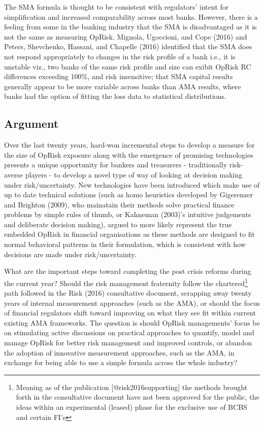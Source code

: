 \documentclass[]{DissertateUSU}
\let\rmarkdownfootnote\footnote%
\def\footnote{\protect\rmarkdownfootnote}
\begin{document}
The SMA formula is thought to be consistent with regulators' intent for
simplification and increased comparability across most banks. However,
there is a feeling from some in the banking industry that the SMA is
disadvantaged as it is not the same as measuring OpRisk. Mignola,
Ugoccioni, and Cope (2016) and Peters, Shevchenko, Hassani, and Chapelle
(2016) identified that the SMA does not respond appropriately to changes
in the risk profile of a bank i.e., it is unstable viz., two banks of
the same risk profile and size can exibit OpRisk RC differences
exceeding 100\%, and risk insensitive; that SMA capital results
generally appear to be more variable across banks than AMA results,
where banks had the option of fitting the loss data to statistical
distributions.

\subsection{Argument}
\label{ssec:Argument}

Over the last twenty years, hard-won incremental steps to develop a
measure for the size of OpRisk exposure along with the emergence of
promising technologies presents a unique opportunity for bankers and
treasurers - traditionally risk-averse players - to develop a novel type
of way of looking at decision making under risk/uncertainty. New
technologies have been introduced which make use of up to date technical
solutions (such as homo heuristics developed by Gigerenzer and Brighton
(2009), who mainatain their methods solve practical finance problems by
simple rules of thumb, or Kahneman (2003)'s intuitive judgements and
deliberate decision making), argued to more likely represent the true
embedded OpRisk in financial organisations as these methods are designed
to fit normal behavioral patterns in their formulation, which is
consistent with how decisions are made under risk/uncertainty.\medskip 

What are the important steps toward completing the post crisis reforms
during the current year? Should the risk management fraternity follow
the
chartered\footnote{Meaning as of the publication [@risk2016supporting] the methods brought forth in the consultative document have not been approved for the public, the ideas within an experimental (leased) phase for the exclusive use of BCBS and certain FI's}
path followed in the Risk (2016) consultative document, scrapping away
twenty years of internal measurement approaches (such as the AMA), or
should the focus of financial regulators shift toward improving on what
they see fit within current existing AMA frameworks. The question is
should OpRisk managements' focus be on stimulating active discussions on
practical approaches to quantify, model and manage OpRisk for better
risk management and improved controls, or abandon the adoption of
innovative measurement approaches, such as the AMA, in exchange for
being able to use a simple formula across the whole industry?\medskip 
\end{document}
